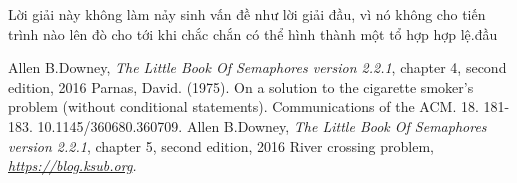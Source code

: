 \documentclass[a4paper]{article}
\begin{document}
	Lời giải này không làm nảy sinh vấn đề như lời giải đầu, vì nó không cho tiến trình nào lên đò 
	cho tới khi chắc chắn có thể hình thành một tổ hợp hợp lệ.đầu

	\pagebreak
	\begin{thebibliography}{9}
  	Allen B.Downey,
  	\textit{The Little Book Of Semaphores version 2.2.1}, chapter 4, second edition, 2016
	\textit{}Parnas, David. (1975). On a solution to the cigarette smoker's problem (without conditional statements). Communications of the ACM. 18. 181-183. 10.1145/360680.360709. 
  	Allen B.Downey,
	\textit{The Little Book Of Semaphores version 2.2.1}, chapter 5, second edition, 2016
	River crossing problem, 
	\textit{\href{https://blog.ksub.org}{https://blog.ksub.org}.}
	\end{thebibliography}
\end{document}
